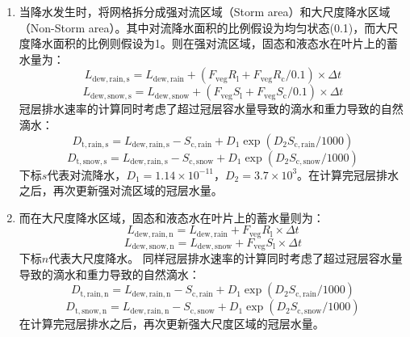 \begin{enumerate}
  \item 当降水发生时，将网格拆分成强对流区域（Storm area）和大尺度降水区域（Non-Storm area）。其中对流降水面积的比例假设为均匀状态(0.1)，而大尺度降水面积的比例则假设为1。则在强对流区域，固态和液态水在叶片上的蓄水量为：
    \begin{equation}
      L_{\mathrm{dew,rain,s}}=L_{\mathrm{dew,rain}}+(F_{\mathrm{veg}}R_{\mathrm{l}}+F_{\mathrm{veg}}R_{\mathrm{c}}/0.1)\times \Delta{t}
    \end{equation}
    \begin{equation}
      L_{\mathrm{dew,snow,s}}=L_{\mathrm{dew,snow}}+(F_{\mathrm{veg}}S_{\mathrm{l}}+F_{\mathrm{veg}}S_{\mathrm{c}}/0.1)\times \Delta{t}
    \end{equation}
    冠层排水速率的计算同时考虑了超过冠层容水量导致的滴水和重力导致的自然滴水：
    \begin{equation}
      D_{\mathrm {t,rain,s}}=L_{\mathrm{dew,rain,s}}-S_{\mathrm{c,rain}}+D_{1} \exp \left(D_{2} S_{\mathrm{c,rain}}/1000\right)
    \end{equation}
    \begin{equation}
      D_{\mathrm {t,snow,s}}=L_{\mathrm{dew,rain,s}}-S_{\mathrm{c,snow}}+D_{1} \exp \left(D_{2} S_{\mathrm{c,snow}}/1000\right)
    \end{equation}
    下标$s$代表对流降水，$D_{1}=1.14 \times 10^{-11}$，$D_{2}=3.7 \times 10^{3}$。在计算完冠层排水之后，再次更新强对流区域的冠层水量。

  \item 而在大尺度降水区域，固态和液态水在叶片上的蓄水量则为：
    \begin{equation}
      L_{\mathrm{dew,rain,n}}=L_{\mathrm{dew,rain}}+F_{\mathrm{veg}}R_{\mathrm{l}}\times \Delta{t}
    \end{equation}
    \begin{equation}
      L_{\mathrm{dew,snow,n}}=L_{\mathrm{dew,snow}}+F_{\mathrm{veg}}S_{\mathrm{l}} \times \Delta{t}
    \end{equation}
    下标$n$代表大尺度降水。
    同样冠层排水速率的计算同时考虑了超过冠层容水量导致的滴水和重力导致的自然滴水：
    \begin{equation}
      D_{\mathrm {t,rain,n}}=L_{\mathrm{dew,rain,n}}-S_{\mathrm{c,rain}}+D_{1} \exp \left(D_{2} S_{\mathrm{c,rain}}/1000\right)
    \end{equation}
    \begin{equation}
      D_{\mathrm {t,snow,n}}=L_{\mathrm{dew,rain,n}}-S_{\mathrm{c,snow}}+D_{1} \exp \left(D_{2} S_{\mathrm{c,snow}}/1000\right)
    \end{equation}
    在计算完冠层排水之后，再次更新强大尺度区域的冠层水量。


\end{enumerate}
